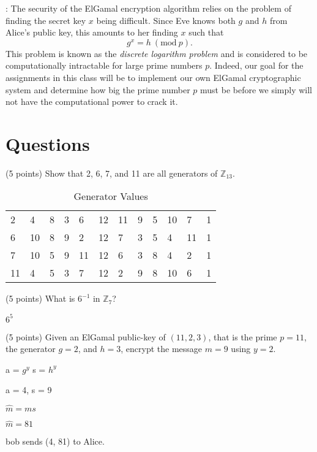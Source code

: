 \documentclass{article}
\newcommand{\myhrule}{ \begin{center}\rule{.9\linewidth}{.25mm}\end{center} }
\newcommand{\pad}{\vspace{8pt}\noindent}
\newcommand{\Mod}[1]{\ (\mathrm{mod}\ #1)}
\begin{document}
\pad{\bf Security}:
The security of the ElGamal encryption algorithm relies on the problem of finding the secret key $x$ being difficult. Since Eve knows both $g$ and $h$ from Alice's public key, this amounts to her finding $x$ such that 
\[
g^x = h\Mod{p}.
\]
This problem is known as the {\em discrete logarithm problem} and is considered to be computationally intractable for large prime numbers $p$. Indeed, our goal for the assignments in this class will be to implement our own ElGamal cryptographic system and determine how big the prime number $p$ must be before we simply will not have the computational power to crack it. 


\section*{Questions}

(5 points) Show that 2, 6, 7, and 11 are all generators of $\mathbb{Z}_{13}$.
\vspace*{1em}

\begin{table}[h!]
\centering
\caption{Generator Values}
\label{my-label}
\begin{tabular}{llllllllllll}
\hline
2  & 4  & 8 & 3 & 6  & 12 & 11 & 9 & 5 & 10 & 7  & 1 \\ 
6  & 10 & 8 & 9 & 2  & 12 & 7  & 3 & 5 & 4  & 11 & 1 \\
7  & 10 & 5 & 9 & 11 & 12 & 6  & 3 & 8 & 4  & 2  & 1 \\
11 & 4  & 5 & 3 & 7  & 12 & 2  & 9 & 8 & 10 & 6  & 1 \\ \hline
\end{tabular}
\end{table}

(5 points) What is $6^{-1}$ in $\mathbb{Z}_{7}$?
\vspace*{1em}

$6^{5}$

(5 points) Given an ElGamal public-key of $(11,2,3)$, that is the prime $p = 11$, the generator $g = 2$, and $h = 3$, encrypt the message $m = 9$ using $y = 2$. 

a = $g^{y}$ s = $h^{y}$

a = 4, s = 9

$\hat{m} = ms $

$\hat{m} = 81$

bob sends (4, 81) to Alice.
\end{document}
